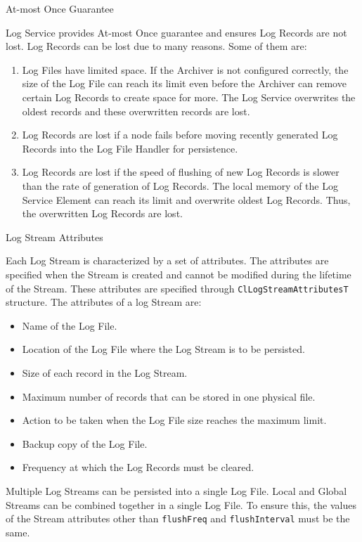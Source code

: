 \begin{flushleft}
\begin{Desc}
\item[At-most Once Guarantee]
\end{Desc}
Log Service provides At-most Once guarantee and ensures Log Records are not lost. Log Records can be lost due to many reasons. Some of 
them are: 
\begin{enumerate}
\item
Log Files have limited space. If the Archiver is not configured correctly, the size of the Log File can reach its limit even before 
the Archiver can remove certain Log Records to create space for more. The Log Service overwrites the oldest records and these overwritten
records are lost. 
\item
Log Records are lost if a node fails before moving recently generated Log Records into the Log File Handler for persistence. 
\item
Log Records are lost if the speed of flushing of new Log Records is slower than the rate of generation of Log Records. The local memory of
the Log Service Element can reach its limit and overwrite oldest Log Records. Thus, the overwritten Log Records are lost.
\end{enumerate}

\begin{Desc}
\item[Log Stream Attributes]
\end{Desc}

Each Log Stream is characterized by a set of attributes. The attributes are specified when the Stream is created and cannot be modified
during the lifetime of the Stream. These attributes are specified through {\tt{ClLogStreamAttributesT}} structure.
The attributes of a log Stream are: 
\begin{itemize}
\item
Name of the Log File.
\item
Location of the Log File where the Log Stream is to be persisted.
\item
Size of each record in the Log Stream.
\item
Maximum number of records that can be stored in one physical file.
\item
Action to be taken when the Log File size reaches the maximum limit.
\item
Backup copy of the Log File.
\item
Frequency at which the Log Records must be cleared. 
\end{itemize}
Multiple Log Streams can be persisted into a single Log File. Local and Global Streams can be combined together in a single Log File.
To ensure this, the values of the Stream attributes other than {\tt{flushFreq}} and {\tt{flushInterval}} must be the same.




\end{flushleft}
